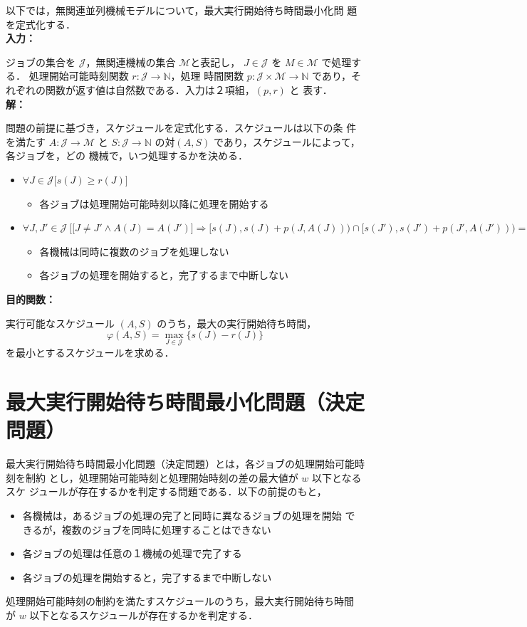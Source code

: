 \documentclass[12pt]{optlab-bachelor}
\begin{document}
以下では，無関連並列機械モデルについて，最大実行開始待ち時間最小化問
題を定式化する．\\

\noindent \textbf{入力：}

ジョブの集合を $\mathcal{J}$，無関連機械の集合 $\mathcal{M}$と表記し，
$J \in \mathcal{J}$ を $M \in \mathcal{M}$ で処理する．
処理開始可能時刻関数 $r : \mathcal{J} \to \mathbb{N}$，処理
時間関数 $p : \mathcal{J} \times \mathcal{M} \to \mathbb{N}$
であり，それぞれの関数が返す値は自然数である．入力は２項組，$(p,r)$ と
表す．\\

\noindent \textbf{解：}

問題の前提に基づき，スケジュールを定式化する．スケジュールは以下の条
件を満たす $A : \mathcal{J} \to \mathcal{M}$ と $S : \mathcal{J} \to
\mathbb{N}$ の対$(A,S)$ であり，スケジュールによって，各ジョブを，どの
機械で，いつ処理するかを決める．
\begin{itemize}
  \item $\forall J \in \mathcal{J}\big[s(J) \ge r(J) \big]$
  \begin{itemize}
    \item 各ジョブは処理開始可能時刻以降に処理を開始する
  \end{itemize}
  \item $\forall J, J' \in \mathcal{J}\ \Big[ \big[J\neq J' \land A(J) = A(J')\big] \Rightarrow [s(J), s(J)+p(J,A(J))) \cap[s(J'), s(J')+p(J', A(J'))) = \emptyset \Big]$
  \begin{itemize}
    \item 各機械は同時に複数のジョブを処理しない
    \item 各ジョブの処理を開始すると，完了するまで中断しない
  \end{itemize}
\end{itemize}

\noindent \textbf{目的関数：}

実行可能なスケジュール $(A,S)$ のうち，最大の実行開始待ち時間，
$$\varphi(A,S) = \displaystyle \max_{J \in \mathcal{J}}\{s(J) -
r(J)\}$$
を最小とするスケジュールを求める．

\section{最大実行開始待ち時間最小化問題（決定問題）}
最大実行開始待ち時間最小化問題（決定問題）とは，各ジョブの処理開始可能時刻を制約
とし，処理開始可能時刻と処理開始時刻の差の最大値が $w$ 以下となるスケ
ジュールが存在するかを判定する問題である．以下の前提のもと，
\begin{itemize}
  \item 各機械は，あるジョブの処理の完了と同時に異なるジョブの処理を開始
  できるが，複数のジョブを同時に処理することはできない
  \item 各ジョブの処理は任意の１機械の処理で完了する
  \item 各ジョブの処理を開始すると，完了するまで中断しない
\end{itemize}
処理開始可能時刻の制約を満たすスケジュールのうち，最大実行開始待ち時間
が $w$ 以下となるスケジュールが存在するかを判定する．
\end{document}
